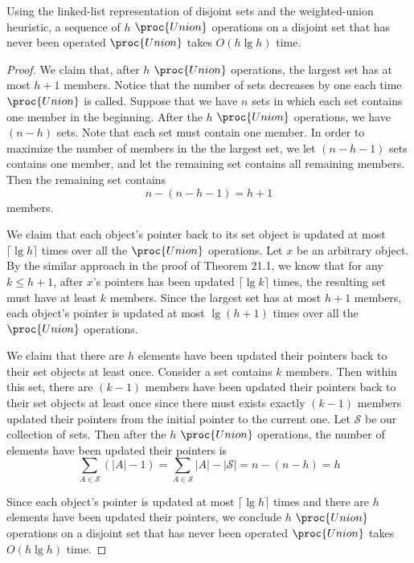 \begin{lemma}
    Using the linked-list representation of disjoint sets and the weighted-union heuristic,
    a sequence of $h$ $\proc{Union}$ operations on a disjoint set 
    that has never been operated $\proc{Union}$
    takes $O(h \lg h)$ time.
\end{lemma}

\begin{proof}
    We claim that, after $h$ $\proc{Union}$ operations,
    the largest set has at most $h + 1$ members. 
    Notice that the number of sets decreases by one each time $\proc{Union}$ is called.
    Suppose that we have $n$ sets in which each set contains one member in the beginning.
    After the $h$ $\proc{Union}$ operations, we have $(n - h)$ sets.
    Note that each set must contain one member.
    In order to maximize the number of members in the the largest set,
    we let $(n - h - 1)$ sets contains one member, 
    and let the remaining set contains all remaining members.
    Then the remaining set contains
    \begin{equation*}
        n - (n - h - 1) = h + 1
    \end{equation*}
    members.

    We claim that each object's pointer back to its set object 
    is updated at most $\lceil \lg h \rceil$ times
    over all the $\proc{Union}$ operations.
    Let $x$ be an arbitrary object.
    By the similar approach in the proof of Theorem 21.1,
    we know that for any $k \leq h + 1$, 
    after $x$'s pointers has been updated $\lceil \lg k \rceil$ times,
    the resulting set must have at least $k$ members.
    Since the largest set has at most $h + 1$ members,
    each object's pointer is updated at most $\lg (h + 1)$ times 
    over all the $\proc{Union}$ operations.

    We claim that there are $h$ elements have been updated their pointers 
    back to their set objects at least once.
    Consider a set contains $k$ members.
    Then within this set, there are $(k - 1)$ members have been updated their pointers 
    back to their set objects at least once
    since there must exists exactly $(k - 1)$ members updated their pointers 
    from the initial pointer to the current one.
    Let $\mathcal{S}$ be our collection of sets.
    Then after the $h$ $\proc{Union}$ operations, 
    the number of elements have been updated their pointers is
    \begin{equation*}
        \sum\limits_{A \in \mathcal{S}} (|A| - 1)
        = \sum\limits_{A \in \mathcal{S}} |A| - |\mathcal{S}|
        = n - (n - h) 
        = h
    \end{equation*}
    
    Since each object's pointer is updated at most $\lceil \lg h \rceil$ times
    and there are $h$ elements have been updated their pointers,
    we conclude $h$ $\proc{Union}$ operations on a disjoint set 
    that has never been operated $\proc{Union}$
    takes $O(h \lg h)$ time.
\end{proof}

